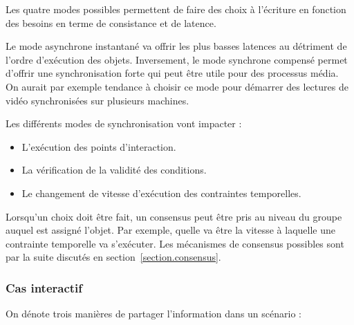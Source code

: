 \documentclass{article}
\newcommand\triggers{points d'interaction\xspace}
\begin{document}
Les quatre modes possibles permettent de faire des choix à l'écriture en fonction des besoins en terme de consistance et de latence.

Le mode asynchrone instantané va offrir les plus basses latences au détriment de l'ordre d'exécution des objets.
Inversement, le mode synchrone compensé permet d'offrir une synchronisation forte qui peut être utile pour des processus média. 
On aurait par exemple tendance à choisir ce mode pour démarrer des lectures de vidéo synchronisées sur plusieurs machines.

Les différents modes de synchronisation vont impacter : 
\begin{itemize}
    \item L'exécution des \triggers.
    \item La vérification de la validité des conditions.
    \item Le changement de vitesse d'exécution des contraintes temporelles.
\end{itemize}

Lorsqu'un choix doit être fait, un consensus peut être pris au niveau du groupe auquel est assigné l'objet. 
Par exemple, quelle va être la vitesse à laquelle une contrainte temporelle va s'exécuter.
Les mécanismes de consensus possibles sont par la suite discutés en section~\ref{section.consensus}.

\subsubsection{Cas interactif}
On dénote trois manières de partager l'information dans un scénario : 
\end{document}
